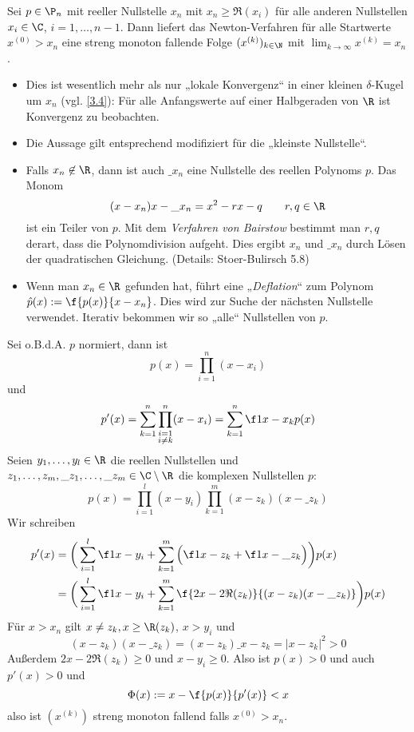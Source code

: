 \documentclass[11pt]{scrbook}
\begin{document}
\begin{st} \label{3.7}
	Sei $p\in \P_n$ mit reeller Nullstelle $x_n$ mit $x_n \ge \Re(x_i)$ für alle anderen Nullstellen $x_i \in \C$, $i=1,\dotsc,n-1$.
	Dann liefert das Newton-Verfahren für alle Startwerte $x^{(0)} > x_n$ eine streng monoton fallende Folge $(x^{(k)})_{k\in\N}$ mit $\lim_{k\to\infty} x^{(k)} = x_n$.
	\begin{note}
		\begin{itemize}
			\item
				Dies ist wesentlich mehr als nur „lokale Konvergenz“ in einer kleinen $\delta$-Kugel um $x_n$ (vgl. \ref{3.4}):
				Für alle Anfangswerte auf einer Halbgeraden von $\R$ ist Konvergenz zu beobachten.
			\item
				Die Aussage gilt entsprechend modifiziert für die „kleinste Nullstelle“.
			\item
				Falls $x_n \not\in \R$, dann ist auch $\_{x_n}$ eine Nullstelle des reellen Polynoms $p$.
				Das Monom
				\[
					(x-x_n){x-\_{x_n}} = x^2 - rx - q
					\qquad r,q \in \R
				\]
				ist ein Teiler von $p$.
				Mit dem \emph{Verfahren von Bairstow} bestimmt man $r,q$ derart, dass die Polynomdivision aufgeht.
				Dies ergibt $x_n$ und $\_{x_n}$ durch Lösen der quadratischen Gleichung.
				(Details: Stoer-Bulirsch 5.8)
			\item
				Wenn man $x_n \in \R$ gefunden hat, führt eine „\emph{Deflation}“ zum Polynom $\hat p(x) := \f {p(x)}{x-x_n}$.
				Dies wird zur Suche der nächsten Nullstelle verwendet.
				Iterativ bekommen wir so „alle“ Nullstellen von $p$.
		\end{itemize}
	\end{note}
	\begin{note}
		Sei o.B.d.A. $p$ normiert, dann ist
		\[
			p(x) = \prod_{i=1}^n (x-x_i)
		\]
		und
		\[
			p'(x) = \sum_{k=1}^n \prod_{\substack{i=1 \\ i\neq k}}^n (x-x_i) = \sum_{k=1}^n \f 1{x-x_k} p(x)
		\]
		Seien $y_1,\dotsc,y_l \in \R$ die reellen Nullstellen und $z_1,\dotsc,z_m,\_{z_1}, \dotsc, \_{z_m} \in \C \setminus \R$ die komplexen Nullstellen $p$:
		\[
			p(x) = \prod_{i=1}^l (x-y_i)\prod_{k=1}^m (x-z_k)(x-\_{z_k})
		\]
		Wir schreiben
		\begin{align*}
			p'(x)  
			&= \bigg( \sum_{i=1}^l \f 1{x-y_i} + \sum_{k=1}^m \Big(\f 1{x-z_k} + \f 1{x-\_{z_k}}\Big) \bigg) p(x) \\
			&= \bigg( \sum_{i=1}^l \f 1{x-y_i} + \sum_{k=1}^m \f {2x - 2\Re(z_k)}{(x-z_k)(x-\_{z_k})}\bigg) p(x)
		\end{align*}
		Für $x>x_n$ gilt $x\neq z_k, x\ge \R(z_k)$, $x > y_i$ und
		\[
			(x-z_k)(x-\_{z_k}) 
			= (x-z_k){\_{x-z_k}}
			= |x-z_k|^2
			> 0
		\]
		Außerdem $2x-2\Re(z_k) \ge 0$ und $x-y_i \ge 0$.
		Also ist $p(x) > 0$ und auch $p'(x) > 0$ und
		\[
			\Phi(x) := x - \f {p(x)}{p'(x)} < x
		\]
		also ist $(x^{(k)})$ streng monoton fallend falls $x^{(0)} > x_n$.


\end{note}
\end{st}
\end{document}
